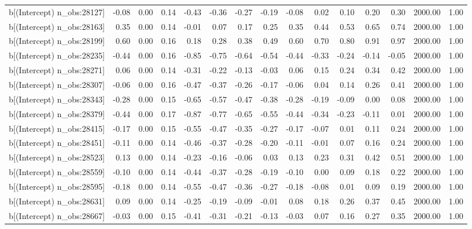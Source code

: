 \begin{table}[ht]
\begin{tabular}{rrrrrrrrrrrrrrr}
  b[(Intercept) n\_obs:28127] & -0.08 & 0.00 & 0.14 & -0.43 & -0.36 & -0.27 & -0.19 & -0.08 & 0.02 & 0.10 & 0.20 & 0.30 & 2000.00 & 1.00 \\ 
  b[(Intercept) n\_obs:28163] & 0.35 & 0.00 & 0.14 & -0.01 & 0.07 & 0.17 & 0.25 & 0.35 & 0.44 & 0.53 & 0.65 & 0.74 & 2000.00 & 1.00 \\ 
  b[(Intercept) n\_obs:28199] & 0.60 & 0.00 & 0.16 & 0.18 & 0.28 & 0.38 & 0.49 & 0.60 & 0.70 & 0.80 & 0.91 & 0.97 & 2000.00 & 1.00 \\ 
  b[(Intercept) n\_obs:28235] & -0.44 & 0.00 & 0.16 & -0.85 & -0.75 & -0.64 & -0.54 & -0.44 & -0.33 & -0.24 & -0.14 & -0.05 & 2000.00 & 1.00 \\ 
  b[(Intercept) n\_obs:28271] & 0.06 & 0.00 & 0.14 & -0.31 & -0.22 & -0.13 & -0.03 & 0.06 & 0.15 & 0.24 & 0.34 & 0.42 & 2000.00 & 1.00 \\ 
  b[(Intercept) n\_obs:28307] & -0.06 & 0.00 & 0.16 & -0.47 & -0.37 & -0.26 & -0.17 & -0.06 & 0.04 & 0.14 & 0.26 & 0.41 & 2000.00 & 1.00 \\ 
  b[(Intercept) n\_obs:28343] & -0.28 & 0.00 & 0.15 & -0.65 & -0.57 & -0.47 & -0.38 & -0.28 & -0.19 & -0.09 & 0.00 & 0.08 & 2000.00 & 1.00 \\ 
  b[(Intercept) n\_obs:28379] & -0.44 & 0.00 & 0.17 & -0.87 & -0.77 & -0.65 & -0.55 & -0.44 & -0.34 & -0.23 & -0.11 & 0.01 & 2000.00 & 1.00 \\ 
  b[(Intercept) n\_obs:28415] & -0.17 & 0.00 & 0.15 & -0.55 & -0.47 & -0.35 & -0.27 & -0.17 & -0.07 & 0.01 & 0.11 & 0.24 & 2000.00 & 1.00 \\ 
  b[(Intercept) n\_obs:28451] & -0.11 & 0.00 & 0.14 & -0.46 & -0.37 & -0.28 & -0.20 & -0.11 & -0.01 & 0.07 & 0.16 & 0.24 & 2000.00 & 1.00 \\ 
  b[(Intercept) n\_obs:28523] & 0.13 & 0.00 & 0.14 & -0.23 & -0.16 & -0.06 & 0.03 & 0.13 & 0.23 & 0.31 & 0.42 & 0.51 & 2000.00 & 1.00 \\ 
  b[(Intercept) n\_obs:28559] & -0.10 & 0.00 & 0.14 & -0.44 & -0.37 & -0.28 & -0.19 & -0.10 & 0.00 & 0.09 & 0.18 & 0.22 & 2000.00 & 1.00 \\ 
  b[(Intercept) n\_obs:28595] & -0.18 & 0.00 & 0.14 & -0.55 & -0.47 & -0.36 & -0.27 & -0.18 & -0.08 & 0.01 & 0.09 & 0.19 & 2000.00 & 1.00 \\ 
  b[(Intercept) n\_obs:28631] & 0.09 & 0.00 & 0.14 & -0.25 & -0.19 & -0.09 & -0.01 & 0.08 & 0.18 & 0.26 & 0.37 & 0.45 & 2000.00 & 1.00 \\ 
  b[(Intercept) n\_obs:28667] & -0.03 & 0.00 & 0.15 & -0.41 & -0.31 & -0.21 & -0.13 & -0.03 & 0.07 & 0.16 & 0.27 & 0.35 & 2000.00 & 1.00 \\ 

\end{tabular}
\end{table}
